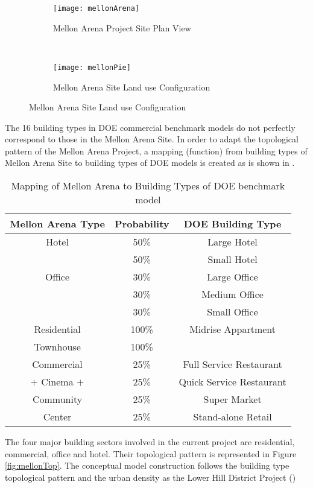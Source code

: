 \begin{figure}[h!]
  \centering
  \begin{subfigure}{0.5\textwidth}
  \centering
  \texttt{[image: mellonArena]}
  \caption[Mellon Arena Site Plan]{Mellon Arena Project Site Plan View}
  \label{fig:mellonArena}
\end{subfigure}
~
\begin{subfigure}{0.3\textwidth}
  \centering
  \texttt{[image: mellonPie]}
  \caption[Mellon Arena Site Land Use]{Mellon Arena Site Land use Configuration}
  \label{fig:mellonPie}
\end{subfigure}
\end{figure}
The 16 building types in DOE commercial benchmark models do not
perfectly correspond to those in the Mellon Arena Site. In order to
adapt the topological pattern of the Mellon Arena Project, a mapping
(function) from building types of Mellon Arena Site to building types
of DOE models is created as is shown in .
\begin{table}[h!]
  \centering
  \begin{tabular}{c| c| c}
    \hline
    Mellon Arena Type &Probability &DOE Building Type\\
    \hline
    \hline
    Hotel &50\%&Large Hotel\\
    \cline{2-3}
    &50\%&Small Hotel\\
    \hline
    Office &30\%&Large Office\\
    \cline{2-3}
    &30\%&Medium Office\\
    \cline{2-3}
    &30\%&Small Office\\
    \hline
    Residential &100\%&Midrise Appartment\\
    \cline{1-2}
    Townhouse &100\%&\\
    \hline
    Commercial &25\%&Full Service Restaurant\\
    \cline{2-3}
    $+$ Cinema $+$&25\%&Quick Service Restaurant\\
    \cline{2-3}
    Community &25\%&Super Market\\
    \cline{2-3}
    Center &25\%&Stand-alone Retail\\
    \hline
  \end{tabular}
  \caption{Mapping of Mellon Arena to Building Types of DOE benchmark model}
  \label{tab:typeMap}
\end{table}

The four major building sectors involved in the current project are
residential, commercial, office and hotel. Their topological pattern
is represented in Figure \ref{fig:mellonTop}. The conceptual model
construction follows the building type topological pattern and the
urban density as the Lower Hill District Project ()

